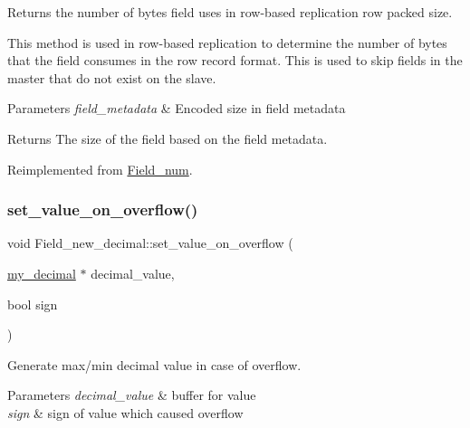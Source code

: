 Returns the number of bytes field uses in row-\/based replication row packed size.

This method is used in row-\/based replication to determine the number of bytes that the field consumes in the row record format. This is used to skip fields in the master that do not exist on the slave.


\begin{DoxyParams}{Parameters}
{\em field\+\_\+metadata} & Encoded size in field metadata\\
\hline
\end{DoxyParams}
\begin{DoxyReturn}{Returns}
The size of the field based on the field metadata. 
\end{DoxyReturn}


Reimplemented from \mbox{\hyperlink{classField__num}{Field\+\_\+num}}.

\mbox{\label{classField__new__decimal_a731366be6adfc65ab3b325235ff7eede}} 
\subsubsection{\texorpdfstring{set\+\_\+value\+\_\+on\+\_\+overflow()}{set\_value\_on\_overflow()}}
{\footnotesize\ttfamily void Field\+\_\+new\+\_\+decimal\+::set\+\_\+value\+\_\+on\+\_\+overflow (\begin{DoxyParamCaption}\item[{\mbox{\hyperlink{classmy__decimal}{my\+\_\+decimal}} $\ast$}]{decimal\+\_\+value,  }\item[{bool}]{sign }\end{DoxyParamCaption})}

Generate max/min decimal value in case of overflow.


\begin{DoxyParams}{Parameters}
{\em decimal\+\_\+value} & buffer for value \\
\hline
{\em sign} & sign of value which caused overflow \\
\hline
\end{DoxyParams}
\mbox{\label{classField__new__decimal_a05d9f15a2a8a5148871c947dfe7a9dbe}} 
